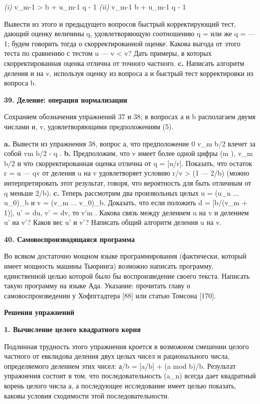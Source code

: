 \textit{(i)} v_{m-1} > b + u_{m-1} \Longrightarrow q \leqslant {} - 1
\textit{(ii)} v_{m-1} \leqslant b + u_{m-1} \Longrightarrow q \geqslant {} - 1

Вывести из этого и предыдущего вопросов быстрый корректирующий тест, дающий оценку  величины q, удовлетворяющую соотношению q =  или же q =  — 1; будем говорить тогда о скорректированной оценке. Какова выгода от этого теста по сравнению с тестом u — v < v? Дать примеры, в которых скорректированная оценка отлична от точного частного.
\textbf{c.} Написать алгоритм деления и на v, используя оценку из вопроса а и быстрый тест корректировки из вопроса b.

\textbf{39. Деление: операция нормализации}

Сохраняем обозначения упражнений 37 и 38; в вопросах а и b располагаем двумя числами и, v, удовлетворяющими предположениям (5).

\textbf{a.} Вывести из упражнения 38, вопрос а, что предположение 0 v_{m} \geqslant \lfloor b/2  влечет за собой vm \geqslant \lfloor b/2 \leqslant {} - q .
\textbf{b.} Предположим, что v имеет более одной цифры (m ), v_{m} \geqslant \lfloor b/2 \rfloor и что скорректированная оценка  отлична от q = [u/r]. Показать, что остаток r = u — qv от деления u на v удовлетворяет условию r/v > (1 — 2/b) (можно интерпретировать этот результат, говоря, что вероятность для  быть отличным от q меньше 2/b).
\textbf{c.} Теперь рассмотрим два произвольных целых u = (u_{n} ... u_{0})_{b} и v = (v_{m} ... v_{0})_{b}. Доказать, что если положить d = [b/(v_{m} + 1)], u' = du, v' = dv, то v'm \geqslant [b/2]. Какова связь между делением u на v и делением u' на v'? Каков вес u' и v'? Написать общий алгоритм деления u на v.

\textbf{40. Самовоспроизводящаяся программа}

Во всяком достаточно мощном языке программирования (фактически, который имеет мощность машины Тьюринга) возможно написать программу, единственной целью которой было бы воспроизведение своего текста. Написать такую программу на языке Ада. Указание: прочитать главу о самовоспроизведении у Хофпггадтера [88] или статью Томсона [170].


\textbf{Решения упражнений}


\textbf{1. Вычисление целого квадратного корня}

Подлинная трудность этого упражнения кроется в возможном смешении целого частного от евклидова деления двух целых чисел и рационального числа, определяемого делением этих чисел: а/b = [a/b] + (a mod b)/b. Результат упражнения состоит в том, что последовательность (a_{n}) всегда дает квадратный корень целого числа а, а последующее исследование имеет целью показать, каковы условия сходимости этой последовательности.

